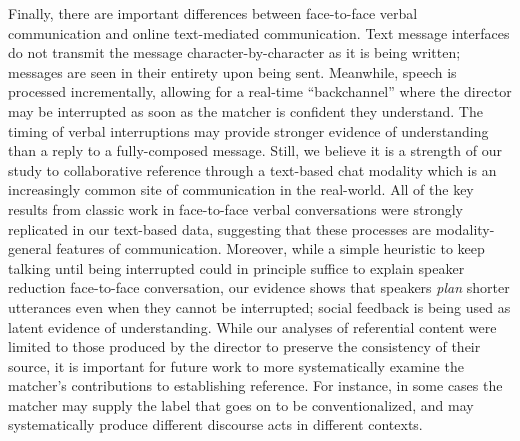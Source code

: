 \documentclass[alpha-refs]{wiley-article}
\begin{document}
Finally, there are important differences between face-to-face verbal communication and online text-mediated communication.
Text message interfaces do not transmit the message character-by-character as it is being written; messages are seen in their entirety upon being sent. 
Meanwhile, speech is processed incrementally, allowing for a real-time ``backchannel'' where the director may be interrupted as soon as the matcher is confident they understand.
The timing of verbal interruptions may provide stronger evidence of understanding than a reply to a fully-composed message.
Still, we believe it is a strength of our study to collaborative reference through a text-based chat modality which is an increasingly common site of communication in the real-world. 
All of the key results from classic work in face-to-face verbal conversations were strongly replicated in our text-based data, suggesting that these processes are modality-general features of communication. 
Moreover, while a simple heuristic to keep talking until being interrupted could in principle suffice to explain speaker reduction face-to-face conversation, our evidence shows that speakers \emph{plan} shorter utterances even when they cannot be interrupted; social feedback is being used as latent evidence of understanding.
While our analyses of referential content were limited to those produced by the director to preserve the consistency of their source, it is important for future work to more systematically examine the matcher's contributions to establishing reference. 
For instance, in some cases the matcher may supply the label that goes on to be conventionalized, and may systematically produce different discourse acts in different contexts.
\end{document}

